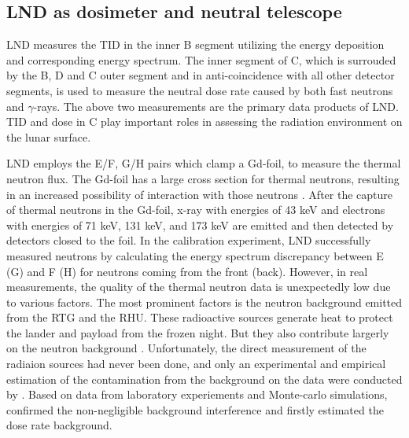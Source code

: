 \subsection{LND as dosimeter and neutral telescope}

\ac{LND} measures the \ac{TID} in the inner B segment utilizing the energy deposition and corresponding energy spectrum. The inner segment of C, which is surrouded by the B, D and C outer segment and in anti-coincidence with all other detector segments, is used to measure the neutral dose rate caused by both fast neutrons and $\gamma$-rays. The above two measurements are the primary data products of \ac{LND}. \ac{TID} and dose in C play important roles in assessing the radiation environment on the lunar surface. 

\ac{LND} employs the E/F, G/H pairs which clamp a Gd-foil, to measure the thermal neutron flux. The Gd-foil has a large cross section for thermal neutrons, resulting in an increased possibility of interaction with those neutrons \citep{Wimmer2020SSRv}. After the capture of thermal neutrons in the Gd-foil, x-ray with energies of 43 keV and electrons with energies of 71 keV, 131 keV, and 173 keV are emitted and then detected by detectors closed to the foil.
In the calibration experiment, \ac{LND} successfully measured neutrons by calculating the energy spectrum discrepancy between E (G) and F (H) for neutrons coming from the front (back).
However, in real measurements, the quality of the thermal neutron data is unexpectedly low due to various factors. The most prominent factors is the neutron background emitted from the \ac{RTG} and the \ac{RHU}. These radioactive sources generate heat to protect the lander and payload from the frozen night. But they also contribute largerly on the neutron background \citep{Zhang2020SciAdv}. Unfortunately, the direct measurement of the radiaion sources had never been done, and only an experimental and empirical estimation of the contamination from the background on the data were conducted by \citet{Hou2020-LNDbackground}. Based on data from laboratory experiements and Monte-carlo simulations, \citet{Hou2020-LNDbackground} confirmed the non-negligible background interference and firstly estimated the dose rate background. 

